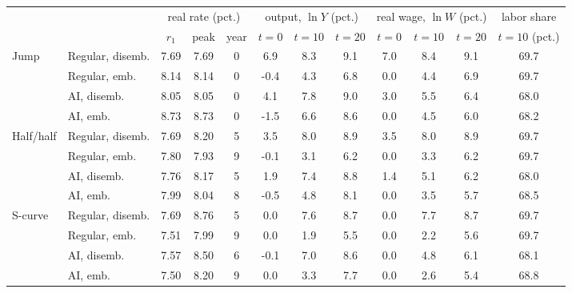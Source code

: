 \begin{tabular}{llcccccccccc}\toprule
 & & \multicolumn{3}{c}{real rate (pct.)} & \multicolumn{3}{c}{output, $\ln Y$ (pct.)} & \multicolumn{3}{c}{real wage, $\ln W$ (pct.)} & labor share\\
\cmidrule(lr){3-5}\cmidrule(lr){6-8}\cmidrule(lr){9-11}\cmidrule(lr){12-12}
 & & $r_1$ & peak & year & $t{=}0$ & $t{=}10$ & $t{=}20$ & $t{=}0$ & $t{=}10$ & $t{=}20$ & $t{=}10$ (pct.)\\\midrule
Jump & Regular, disemb. & 7.69 & 7.69 & 0 & 6.9 & 8.3 & 9.1 & 7.0 & 8.4 & 9.1 & 69.7\\
 & Regular, emb. & 8.14 & 8.14 & 0 & -0.4 & 4.3 & 6.8 & 0.0 & 4.4 & 6.9 & 69.7\\
 & AI, disemb. & 8.05 & 8.05 & 0 & 4.1 & 7.8 & 9.0 & 3.0 & 5.5 & 6.4 & 68.0\\
 & AI, emb. & 8.73 & 8.73 & 0 & -1.5 & 6.6 & 8.6 & 0.0 & 4.5 & 6.0 & 68.2\\
\midrule
Half/half & Regular, disemb. & 7.69 & 8.20 & 5 & 3.5 & 8.0 & 8.9 & 3.5 & 8.0 & 8.9 & 69.7\\
 & Regular, emb. & 7.80 & 7.93 & 9 & -0.1 & 3.1 & 6.2 & 0.0 & 3.3 & 6.2 & 69.7\\
 & AI, disemb. & 7.76 & 8.17 & 5 & 1.9 & 7.4 & 8.8 & 1.4 & 5.1 & 6.2 & 68.0\\
 & AI, emb. & 7.99 & 8.04 & 8 & -0.5 & 4.8 & 8.1 & 0.0 & 3.5 & 5.7 & 68.5\\
\midrule
S-curve & Regular, disemb. & 7.69 & 8.76 & 5 & 0.0 & 7.6 & 8.7 & 0.0 & 7.7 & 8.7 & 69.7\\
 & Regular, emb. & 7.51 & 7.99 & 9 & 0.0 & 1.9 & 5.5 & 0.0 & 2.2 & 5.6 & 69.7\\
 & AI, disemb. & 7.57 & 8.50 & 6 & -0.1 & 7.0 & 8.6 & 0.0 & 4.8 & 6.1 & 68.1\\
 & AI, emb. & 7.50 & 8.20 & 9 & 0.0 & 3.3 & 7.7 & 0.0 & 2.6 & 5.4 & 68.8\\
\bottomrule\end{tabular}

